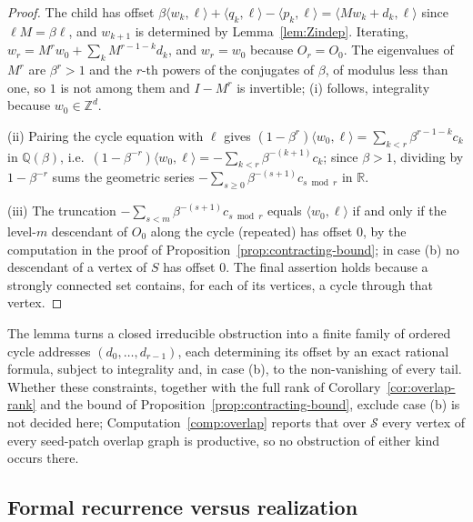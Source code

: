 \documentclass[11pt]{amsart}
\theoremstyle{plain}
\theoremstyle{definition}
\theoremstyle{remark}
\newcommand{\Z}{\mathbb{Z}}
\newcommand{\Q}{\mathbb{Q}}
\newcommand{\R}{\mathbb{R}}
\begin{document}
\begin{proof}
The child has offset $\beta\langle w_k,\ell\rangle+\langle q_k,\ell\rangle-\langle p_k,\ell\rangle=\langle Mw_k+d_k,\ell\rangle$ since $\ell M=\beta\ell$, and $w_{k+1}$ is determined by Lemma~\ref{lem:Zindep}. Iterating, $w_r=M^rw_0+\sum_kM^{r-1-k}d_k$, and $w_r=w_0$ because $O_r=O_0$. The eigenvalues of $M^r$ are $\beta^r>1$ and the $r$-th powers of the conjugates of $\beta$, of modulus less than one, so $1$ is not among them and $I-M^r$ is invertible; (i) follows, integrality because $w_0\in\Z^d$.

(ii) Pairing the cycle equation with $\ell$ gives $(1-\beta^r)\langle w_0,\ell\rangle=\sum_{k<r}\beta^{r-1-k}c_k$ in $\Q(\beta)$, i.e.\ $(1-\beta^{-r})\langle w_0,\ell\rangle=-\sum_{k<r}\beta^{-(k+1)}c_k$; since $\beta>1$, dividing by $1-\beta^{-r}$ sums the geometric series $-\sum_{s\ge0}\beta^{-(s+1)}c_{s\bmod r}$ in $\R$.

(iii) The truncation $-\sum_{s<m}\beta^{-(s+1)}c_{s\bmod r}$ equals $\langle w_0,\ell\rangle$ if and only if the level-$m$ descendant of $O_0$ along the cycle (repeated) has offset $0$, by the computation in the proof of Proposition~\ref{prop:contracting-bound}; in case (b) no descendant of a vertex of $S$ has offset $0$. The final assertion holds because a strongly connected set contains, for each of its vertices, a cycle through that vertex.
\end{proof}

The lemma turns a closed irreducible obstruction into a finite family of ordered cycle addresses $(d_0,\dots,d_{r-1})$, each determining its offset by an exact rational formula, subject to integrality and, in case (b), to the non-vanishing of every tail. Whether these constraints, together with the full rank of Corollary~\ref{cor:overlap-rank} and the bound of Proposition~\ref{prop:contracting-bound}, exclude case (b) is not decided here; Computation~\ref{comp:overlap} reports that over $\mathcal S$ every vertex of every seed-patch overlap graph is productive, so no obstruction of either kind occurs there.

\subsection{Formal recurrence versus realization}\label{sec:realization}
\end{document}
